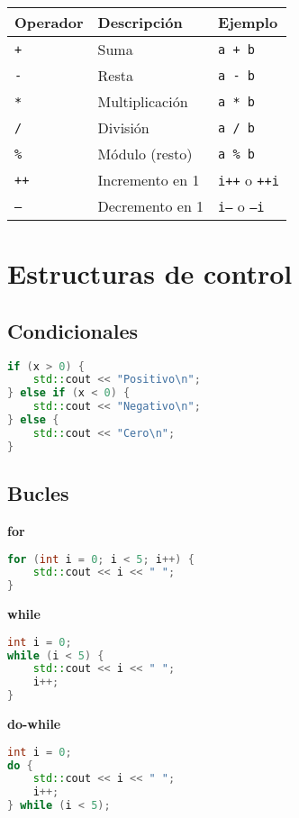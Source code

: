 \documentclass[a4paper]{article}
\begin{document}
\begin{tabular}{|l|l|l|}
\hline
\textbf{Operador} & \textbf{Descripción} & \textbf{Ejemplo} \\
\hline
\texttt{+} & Suma & \texttt{a + b} \\
\texttt{-} & Resta & \texttt{a - b} \\
\texttt{*} & Multiplicación & \texttt{a * b} \\
\texttt{/} & División & \texttt{a / b} \\
\texttt{\%} & Módulo (resto) & \texttt{a \% b} \\
\texttt{++} & Incremento en 1 & \texttt{i++} o \texttt{++i} \\
\texttt{--} & Decremento en 1 & \texttt{i--} o \texttt{--i} \\
\hline
\end{tabular}

\section{Estructuras de control}

\subsection{Condicionales}

\begin{lstlisting}[language=C++]
if (x > 0) {
    std::cout << "Positivo\n";
} else if (x < 0) {
    std::cout << "Negativo\n";
} else {
    std::cout << "Cero\n";
}
\end{lstlisting}

\subsection{Bucles}

\textbf{for}

\begin{lstlisting}[language=C++]
for (int i = 0; i < 5; i++) {
    std::cout << i << " ";
}
\end{lstlisting}

\textbf{while}

\begin{lstlisting}[language=C++]
int i = 0;
while (i < 5) {
    std::cout << i << " ";
    i++;
}
\end{lstlisting}

\textbf{do-while}

\begin{lstlisting}[language=C++]
int i = 0;
do {
    std::cout << i << " ";
    i++;
} while (i < 5);
\end{lstlisting}
\end{document}
